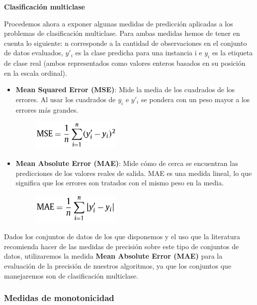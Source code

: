 \textbf{Clasificación multiclase}

Procedemos ahora a exponer algunas medidas de predicción aplicadas a los problemas de clasificación multiclase. Para ambas medidas hemos de tener en cuenta lo siguiente: n corresponde a la cantidad de observaciones en el conjunto de datos evaluados, $y'_i$ es la clase predicha para una instancia i e $y_i$ es la etiqueta de clase real (ambos representados como valores enteros basados en su posición en la escala ordinal).

\begin{itemize}
	\item \textbf{Mean Squared Error (MSE)}: Mide la media de los cuadrados de los errores. Al usar los cuadrados de $y_i$ e $y'_i$ se pondera con un peso mayor a los errores más grandes.
	\begin{figure}[H]
		\centering
		\includegraphics[width=0.4\textwidth]{imagenes/f6} 
	\end{figure}

	\item \textbf{Mean Absolute Error (MAE)}: Mide cómo de cerca se encuentran las predicciones de los valores reales de salida. MAE es una medida lineal, lo que significa que los errores son tratados con el mismo peso en la media.
	\begin{figure}[H]
		\centering
		\includegraphics[width=0.4\textwidth]{imagenes/f7} 
	\end{figure}
\end{itemize}

Dados los conjuntos de datos de los que disponemos y el uso que la literatura recomienda hacer de las medidas de precisión sobre este tipo de conjuntos de datos, utilizaremos la medida\textbf{ Mean Absolute Error (MAE)} para la evaluación de la precisión de nuestros algoritmos, ya que los conjuntos que manejaremos son de clasificación multiclase.

\subsubsection{Medidas de monotonicidad}

